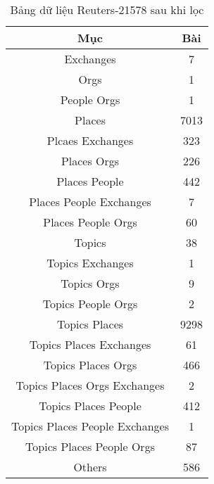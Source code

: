\begin{table}[ht]
\begin{center}
\begin{tabular}{|c|c|}
\hline
Mục & Bài \\
\hline
Exchanges & 7\\
\hline
Orgs & 1\\
\hline
People Orgs & 1\\
\hline
Places & 7013\\
\hline
Plcaes Exchanges & 323\\
\hline
Places Orgs & 226\\
\hline
Places People & 442\\
\hline
Places People Exchanges & 7\\
\hline
Places People Orgs & 60\\
\hline
Topics & 38\\
\hline
Topics Exchanges & 1\\
\hline
Topics Orgs & 9\\
\hline
Topics People Orgs & 2\\
\hline
Topics Places & 9298\\
\hline
Topics Places Exchanges & 61\\
\hline
Topics Places Orgs & 466\\
\hline
Topics Places Orgs Exchanges & 2\\
\hline
Topics Places People & 412\\
\hline
Topics Places People Exchanges & 1\\
\hline
Topics Places People Orgs & 87\\
\hline
Others & 586\\
\hline
\end{tabular}
\caption[Bảng dữ liệu Reuters]{Bảng dữ liệu Reuters-21578 sau khi lọc}
\label{tab:bang_4_1}
\end{center}
\end{table}
\noindent

